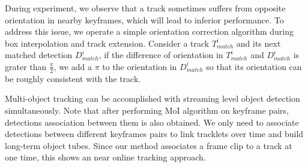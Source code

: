 \documentclass[letterpaper, 10pt, conference]{ieeeconf}  %
\begin{document}
During experiment, we observe that a track sometimes suffers from opposite orientation in nearby keyframes, which will lead to inferior performance. To address this issue, we operate a simple orientation correction algorithm during box interpolation and track extension. Consider a track $T^i_{match}$ and its next matched detection $D^i_{match}$, if the difference of orientation in $T^i_{match}$ and $D^i_{match}$ is grater than $\frac{\pi}{2}$, we add a $\pi$ to the orientation in $D^i_{match}$ so that its orientation can be roughly consistent with the track. 

Multi-object tracking can be accomplished with streaming level object detection simultaneously. Note that after performing MoI algorithm on keyframe pairs, detections association between them is also obtained. We only need to associate detections between different keyframes pairs to link tracklets over time and build long-term object tubes. Since our method associates a frame clip to a track at one time, this shows an near online tracking approach.

\end{document}
